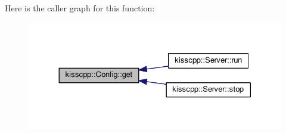 Here is the caller graph for this function\-:
\nopagebreak
\begin{figure}[H]
\begin{center}
\leavevmode
\includegraphics[width=330pt]{classkisscpp_1_1_config_ae237509831f23cd9cbfc67dcd6ed8c9d_icgraph}
\end{center}
\end{figure}



